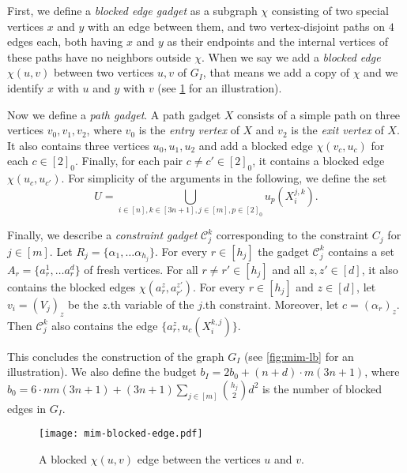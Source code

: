 \documentclass[a4paper,UKenglish,cleveref, autoref, thm-restate]{lipics-v2021}
\begin{document}
First, we define a \emph{blocked edge gadget} as a subgraph $\chi$ consisting of two special vertices $x$ and $y$ with an edge between them, and two vertex-disjoint paths on $4$ edges each, both having $x$ and $y$ as their endpoints and the internal vertices of these paths have no neighbors outside $\chi$. 
When we say we add a \emph{blocked edge} $\chi(u,v)$ between two vertices $u,v$ of $G_I$, that means we add a copy of $\chi$ and we identify $x$ with $u$ and $y$ with $v$ (see \cref{fig:mim-blocked-edge} for an illustration).

Now we define a \emph{path gadget}. 
A path gadget $X$ consists of a simple path on three vertices $v_0, v_1, v_2$, where $v_0$ is the \emph{entry vertex} of $X$ and $v_2$ is the \emph{exit vertex} of $X$. 
It also contains three vertices $u_0, u_1, u_2$ and add a blocked edge $\chi(v_c, u_c)$ for each $c\in[2]_0$. 
Finally, for each pair $c \neq c' \in [2]_0$, it contains a blocked edge $\chi(u_c,u_{c'})$.
For simplicity of the arguments in the following, we define the set 
\[
    U = \bigcup_{i \in [n], k \in [3n+1], j \in [m], p \in [2]_0} u_p(X_i^{j,k}).
\]

Finally, we describe a \emph{constraint gadget} $\mathscr{C}_j^k$ corresponding to the constraint $C_j$ for $j \in [m]$. 
Let $R_j = \{\alpha_1,\dots \alpha_{h_j}\}$. 
For every $r \in [h_j]$ the gadget $\mathscr{C}_j^k$ contains a set $A_r=\{a_r^1,\dots a_r^d\}$ of fresh vertices. 
For all $r\neq r' \in [h_j]$ and all $z,z'\in[d]$, it also contains the blocked edges $\chi(a_r^z, a_{r'}^{z'})$. 
For every $r\in[h_j]$ and $z\in[d]$, let $v_i = (V_j)_z$ be the $z$.th variable of the $j$.th constraint. Moreover, let $c = (\alpha_r)_z$. 
Then $\mathscr{C}_j^k$ also contains the edge $\{a_r^z, u_c(X_i^{k,j})\}$.

This concludes the construction of the graph $G_I$ (see \cref{fig:mim-lb} for an illustration). 
We also define the budget $b_I = 2 b_0 + (n+d)\cdot m(3n+1)$, where $b_0 = 6 \cdot nm(3n+1) + (3n+1)\sum_{j \in [m]} {h_j \choose 2} d^2$ is the number of blocked edges in $G_I$.
 
\begin{figure}[t]
    \centering
    \texttt{[image: mim-blocked-edge.pdf]}
    \caption{A blocked $\chi(u, v)$ edge between the vertices $u$ and $v$.}  
    \label{fig:mim-blocked-edge}
\end{figure} 
\end{document}
